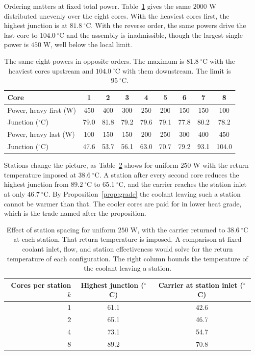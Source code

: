\documentclass[11pt,openany]{book}
\theoremstyle{plain}
\theoremstyle{definition}
\theoremstyle{remark}
\begin{document}
Ordering matters at fixed total power. Table~\ref{tab:order} gives the same $2000$ W distributed unevenly over the eight cores. With the heaviest cores first, the highest junction is at $81.8\ ^\circ$C. With the reverse order, the same powers drive the last core to $104.0\ ^\circ$C and the assembly is inadmissible, though the largest single power is $450$ W, well below the local limit.

\begin{table}[t]
\centering
\small
\begin{tabular}{@{}lcccccccc@{}}
\toprule
Core & 1 & 2 & 3 & 4 & 5 & 6 & 7 & 8 \\
\midrule
Power, heavy first (W) & 450 & 400 & 300 & 250 & 200 & 150 & 150 & 100 \\
Junction ($^\circ$C) & 79.0 & 81.8 & 79.2 & 79.6 & 79.1 & 77.8 & 80.2 & 78.2 \\
\midrule
Power, heavy last (W) & 100 & 150 & 150 & 200 & 250 & 300 & 400 & 450 \\
Junction ($^\circ$C) & 47.6 & 53.7 & 56.1 & 63.0 & 70.7 & 79.2 & 93.1 & 104.0 \\
\bottomrule
\end{tabular}
\caption{The same eight powers in opposite orders. The maximum is $81.8\ ^\circ$C with the heaviest cores upstream and $104.0\ ^\circ$C with them downstream. The limit is $95\ ^\circ$C.}
\label{tab:order}
\end{table}

Stations change the picture, as Table~\ref{tab:stations} shows for uniform $250$ W with the return temperature imposed at $38.6\ ^\circ$C. A station after every second core reduces the highest junction from $89.2\ ^\circ$C to $65.1\ ^\circ$C, and the carrier reaches the station inlet at only $46.7\ ^\circ$C. By Proposition~\ref{prop:grade} the coolant leaving such a station cannot be warmer than that. The cooler cores are paid for in lower heat grade, which is the trade named after the proposition.

\begin{table}[t]
\centering
\small
\begin{tabular}{@{}rcc@{}}
\toprule
Cores per station $k$ & Highest junction ($^\circ$C) & Carrier at station inlet ($^\circ$C) \\
\midrule
1 & 61.1 & 42.6 \\
2 & 65.1 & 46.7 \\
4 & 73.1 & 54.7 \\
8 & 89.2 & 70.8 \\
\bottomrule
\end{tabular}
\caption{Effect of station spacing for uniform $250$ W, with the carrier returned to $38.6\ ^\circ$C at each station. That return temperature is imposed. A comparison at fixed coolant inlet, flow, and station effectiveness would solve for the return temperature of each configuration. The right column bounds the temperature of the coolant leaving a station.}
\label{tab:stations}
\end{table}
\end{document}
